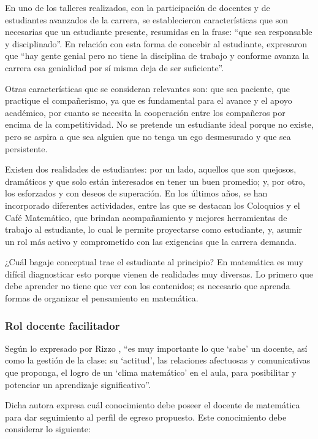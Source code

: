 En uno de los talleres realizados, con la participación de docentes y de estudiantes avanzados de la carrera, se establecieron características que son necesarias que un estudiante presente, resumidas en la frase: “que sea responsable y disciplinado”. En relación con esta forma de concebir al estudiante, expresaron que “hay gente genial pero no tiene la disciplina de trabajo y conforme avanza la carrera esa genialidad por sí misma deja de ser suficiente”.

Otras características que se consideran relevantes son: que sea paciente, que practique el compañerismo, ya que es fundamental para el avance y el apoyo académico, por cuanto se necesita la cooperación entre los compañeros por encima de la competitividad. No se pretende un estudiante ideal porque no existe, pero se aspira a que sea alguien que no tenga un ego desmesurado y que sea persistente.

Existen dos realidades de estudiantes: por un lado, aquellos que son quejosos, dramáticos y que solo están interesados en tener un buen promedio; y, por otro, los esforzados y con deseos de superación. En los últimos años, se han incorporado diferentes actividades, entre las que se destacan los Coloquios y el Café Matemático, que brindan acompañamiento y mejores herramientas de trabajo al estudiante, lo cual le permite proyectarse como estudiante, y, asumir un rol más activo y comprometido con las exigencias que la carrera demanda. 

¿Cuál bagaje conceptual trae el estudiante al principio? En matemática es muy difícil diagnosticar esto porque vienen de realidades muy diversas. Lo primero que debe aprender no tiene que ver con los contenidos; es necesario que aprenda formas de organizar el pensamiento en matemática. 

\subsubsection*{Rol docente facilitador}

Según lo expresado por Rizzo \cite[p.~15]{rizzo2017ser}, “es muy importante lo que ‘sabe’ un docente, así como la gestión de la clase: su ‘actitud’, las relaciones afectuosas y comunicativas que proponga, el logro de un ‘clima matemático’ en el aula, para posibilitar y potenciar un aprendizaje significativo”. 

Dicha autora expresa cuál conocimiento debe poseer el docente de matemática para dar seguimiento al perfil de egreso propuesto. Este conocimiento debe considerar lo siguiente: 

